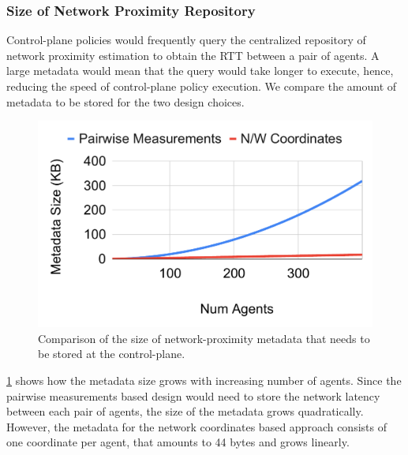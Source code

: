 \subsubsection{Size of Network Proximity Repository}
Control-plane policies would frequently query the centralized repository of network proximity estimation to obtain the RTT between a pair of agents. A large metadata would mean that the query would take longer to execute, hence, reducing the speed of control-plane policy execution. We compare the amount of metadata to be stored for the two design choices. 

\begin{figure}
\centering
\includegraphics[width=0.75\linewidth]{figures/design_space/nw_prox/metadata_size.pdf}
\caption{Comparison of the size of network-proximity metadata that needs to be stored at the control-plane.}
\label{fig:metadata_size}
\end{figure}

\par \cref{fig:metadata_size} shows how the metadata size grows with increasing number of agents. Since the pairwise measurements based design would need to store the network latency between each pair of agents, the size of the metadata grows quadratically. However, the metadata for the network coordinates based approach consists of one coordinate per agent, that amounts to 44 bytes and grows linearly.
\par {}

